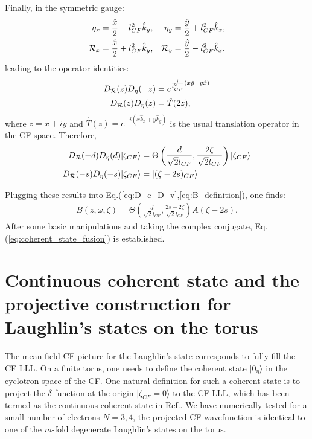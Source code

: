\begin{subappendices}
Finally, in the symmetric gauge:
\begin{align}
\eta_x&=\frac{\hat x}{2}-l^2_{CF} \hat k_y,&\eta_y&=\frac{\hat y}{2}+l^2_{CF} \hat k_x,\notag\\
\mathcal R_x&=\frac{\hat x}{2}+l^2_{CF} \hat k_y,&\mathcal R_y&=\frac{\hat y}{2}-l^2_{CF} \hat k_x.\notag\\
\end{align}
leading to the operator identities:
\begin{align}
D_{\mathcal R}(z) D_{\eta}(-z)&=e^{\frac{i}{l_{CF}^2}(x\hat y-y\hat x)}\notag\\
D_{\mathcal R}(z) D_{\eta}(z)&=\hat T(2z),
\end{align}
where $z=x+iy$ and $\hat T(z)=e^{-i(x \hat k_x+y\hat k_y)}$ is the usual translation operator in the CF space. Therefore,
\begin{align}
D_{\mathcal R}(-d)D_{\eta}(d)|\zeta_{CF}\rangle &=\Theta\left(\frac{d}{\sqrt{2}l_{CF}},\frac{2\zeta}{\sqrt{2}l_{CF}}\right)|\zeta_{CF}\rangle\notag\\
D_{\mathcal R}(-s)D_{\eta}(-s)|\zeta_{CF}\rangle&=|(\zeta-2s)_{CF}\rangle
\end{align}

Plugging these results into Eq.(\ref{eq:D_e_D_v},\ref{eq:B_definition}), one finds:
\begin{align}
B(z,\omega,\zeta)=\Theta\left(\frac{d}{\sqrt{2}l_{CF}},\frac{2s-2\zeta}{\sqrt{2}l_{CF}}\right)A(\zeta-2s).
\end{align}
After some basic manipulations and taking the complex conjugate, Eq.(\ref{eq:coherent_state_fusion}) is established.


\section{Continuous coherent state and the projective construction for Laughlin's states on the torus}\label{app:ccs}
The mean-field CF picture for the Laughlin's state corresponds to fully fill the CF LLL. On a finite torus, one needs to define the coherent state $|0_{\eta}\rangle$ in the cyclotron space of the CF. One natural definition for such a coherent state is to project the $\delta$-function at the origin $|\zeta_{CF}=0\rangle$ to the CF LLL, which has been termed as the continuous coherent state in Ref.\cite{fremling2014coherent}. We have numerically tested for a small number of electrons $N=3,4$, the projected CF wavefunction is identical to one of the $m$-fold degenerate Laughlin's states on the torus.


\end{subappendices}
